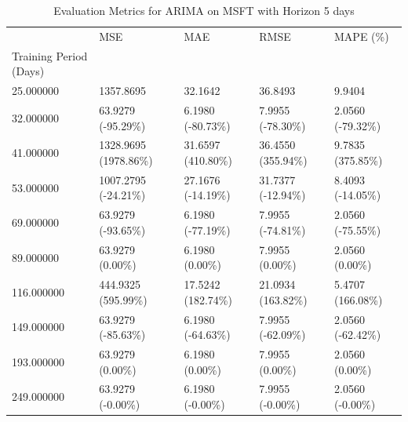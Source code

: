 \begin{table}
\caption{Evaluation Metrics for ARIMA on MSFT with Horizon 5 days}
\label{tab:arima_MSFT_h5_metrics}
\begin{tabular}{lllll}
\toprule
 & MSE & MAE & RMSE & MAPE (\%) \\
Training Period (Days) &  &  &  &  \\
\midrule
25.000000 & 1357.8695 & 32.1642 & 36.8493 & 9.9404 \\
32.000000 & 63.9279 (-95.29\%) & 6.1980 (-80.73\%) & 7.9955 (-78.30\%) & 2.0560 (-79.32\%) \\
41.000000 & 1328.9695 (1978.86\%) & 31.6597 (410.80\%) & 36.4550 (355.94\%) & 9.7835 (375.85\%) \\
53.000000 & 1007.2795 (-24.21\%) & 27.1676 (-14.19\%) & 31.7377 (-12.94\%) & 8.4093 (-14.05\%) \\
69.000000 & 63.9279 (-93.65\%) & 6.1980 (-77.19\%) & 7.9955 (-74.81\%) & 2.0560 (-75.55\%) \\
89.000000 & 63.9279 (0.00\%) & 6.1980 (0.00\%) & 7.9955 (0.00\%) & 2.0560 (0.00\%) \\
116.000000 & 444.9325 (595.99\%) & 17.5242 (182.74\%) & 21.0934 (163.82\%) & 5.4707 (166.08\%) \\
149.000000 & 63.9279 (-85.63\%) & 6.1980 (-64.63\%) & 7.9955 (-62.09\%) & 2.0560 (-62.42\%) \\
193.000000 & 63.9279 (0.00\%) & 6.1980 (0.00\%) & 7.9955 (0.00\%) & 2.0560 (0.00\%) \\
249.000000 & 63.9279 (-0.00\%) & 6.1980 (-0.00\%) & 7.9955 (-0.00\%) & 2.0560 (-0.00\%) \\
\bottomrule
\end{tabular}
\end{table}
